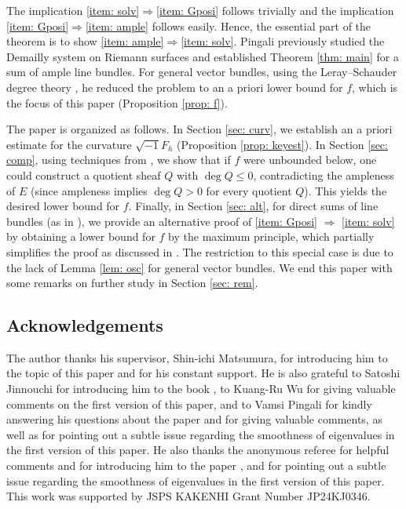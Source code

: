 \documentclass[a4, 12pt, 
]{amsart}
\numberwithin{equation}{section}
\theoremstyle{plain}
\theoremstyle{definition}
\theoremstyle{remark}
\begin{document}
The implication \eqref{item: solv}$\Rightarrow$\eqref{item: Gposi} follows trivially and
the implication \eqref{item: Gposi}$\Rightarrow$\eqref{item: ample} follows easily. Hence, the essential part of the theorem is to show \eqref{item: ample}$\Rightarrow$\eqref{item: solv}.
Pingali \cite{Pin23} previously studied the Demailly system on Riemann surfaces and established Theorem \ref{thm: main} for a sum of ample line bundles. For general vector bundles, using the Leray–Schauder degree theory \cite[Theorem 1.2]{Pin23}, he reduced the problem to an a priori lower bound for $f$, which is the focus of this paper (Proposition \ref{prop: f}).

The paper is organized as follows. In Section \ref{sec: curv}, we establish an a priori estimate for the curvature $\sqrt{-1}F_h$ (Proposition \ref{prop: keyest}). In Section \ref{sec: comp}, using techniques from \cite{UY}, we show that if $f$ were unbounded below, one could construct a quotient sheaf $Q$ with $\deg Q \le 0$, contradicting the ampleness of $E$ (since ampleness implies $\deg Q > 0$ for every quotient $Q$). This yields the desired lower bound for $f$.
Finally, in Section \ref{sec: alt}, for direct sums of line bundles (as in \cite{Pin23}), we provide an alternative proof of \eqref{item: Gposi} $\Rightarrow$ \eqref{item: solv} by obtaining a lower bound for $f$ by the maximum principle, which partially simplifies the proof as discussed in \cite[Remark 3.1]{Pin23}. The restriction to this special case is due to the lack of Lemma \ref{lem: osc} for general vector bundles.
We end this paper with some remarks on further study in Section \ref{sec: rem}.

\subsection*{Acknowledgements}
The author thanks his supervisor, Shin-ichi Matsumura, for introducing him to the topic of this paper and for his constant support. He is also grateful to Satoshi Jinnouchi for introducing him to the book \cite{LT}, to Kuang-Ru Wu for giving valuable comments on the first version of this paper, and to Vamsi Pingali for kindly answering his questions about the paper \cite{Pin23} and for giving valuable comments, as well as for pointing out a subtle issue regarding the smoothness of eigenvalues in the first version of this paper. He also thanks the anonymous referee for helpful comments and for introducing him to the paper \cite{LZZ}, and for pointing out a subtle issue regarding the smoothness of eigenvalues in the first version of this paper.
This work was supported by JSPS KAKENHI Grant Number JP24KJ0346.
\end{document}
